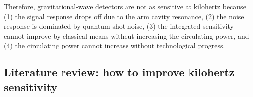 Therefore, gravitational-wave detectors are not as sensitive at kilohertz because (1) the signal response drops off due to the arm cavity resonance, (2) the noise response is dominated by quantum shot noise, (3) the integrated sensitivity cannot improve by classical means without increasing the circulating power, and (4) the circulating power cannot increase without technological progress.



\subsection{Literature review: how to improve kilohertz sensitivity}
\label{sec:intro_literature_review}

